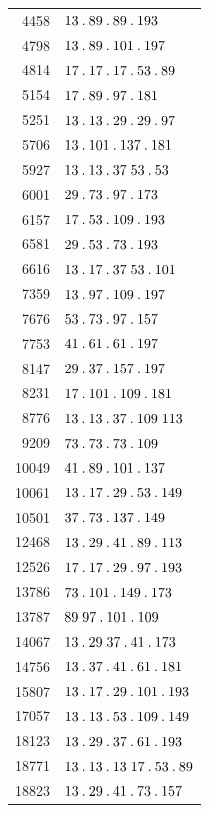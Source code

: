 \begin{longtable}{@{}r|l@{}}
4458 & $13\mathbin{.} 89\mathbin{.} 89\mathbin{.} 193$\\
4798 & $13\mathbin{.} 89\mathbin{.} 101\mathbin{.} 197$\\
4814 & $17\mathbin{.} 17\mathbin{.} 17\mathbin{.} 53\mathbin{.} 89$\\
5154 & $17\mathbin{.} 89\mathbin{.} 97\mathbin{.} 181$\\
5251 & $13\mathbin{.} 13\mathbin{.} 29\mathbin{.} 29\mathbin{.} 97$\\
5706 & $13\mathbin{.} 101\mathbin{.} 137\mathbin{.} 181$\\
5927 & $13\mathbin{.} 13\mathbin{.} 37\;53\mathbin{.} 53$\\
6001 & $29\mathbin{.} 73\mathbin{.} 97\mathbin{.} 173$\\
6157 & $17\mathbin{.} 53\mathbin{.} 109\mathbin{.} 193$\\
6581 & $29\mathbin{.} 53\mathbin{.} 73\mathbin{.} 193$\\
6616 & $13\mathbin{.} 17\mathbin{.} 37\;53\mathbin{.} 101$\\
7359 & $13\mathbin{.} 97\mathbin{.} 109\mathbin{.} 197$\\
7676 & $53\mathbin{.} 73\mathbin{.} 97\mathbin{.} 157$\\
7753 & $41\mathbin{.} 61\mathbin{.} 61\mathbin{.} 197$\\
8147 & $29\mathbin{.} 37\mathbin{.} 157\mathbin{.} 197$\\
8231 & $17\mathbin{.} 101\mathbin{.} 109\mathbin{.} 181$\\
8776 & $13\mathbin{.} 13\mathbin{.} 37\mathbin{.} 109\;113$\\
9209 & $73\mathbin{.} 73\mathbin{.} 73\mathbin{.} 109$\\
10049 & $41\mathbin{.} 89\mathbin{.} 101\mathbin{.} 137$\\
10061 & $13\mathbin{.} 17\mathbin{.} 29\mathbin{.} 53\mathbin{.} 149$\\
10501 & $37\mathbin{.} 73\mathbin{.} 137\mathbin{.} 149$\\
12468 & $13\mathbin{.} 29\mathbin{.} 41\mathbin{.} 89\mathbin{.} 113$\\
12526 & $17\mathbin{.} 17\mathbin{.} 29\mathbin{.} 97\mathbin{.} 193$\\
13786 & $73\mathbin{.} 101\mathbin{.} 149\mathbin{.} 173$\\
13787 & $89\;97\mathbin{.} 101\mathbin{.} 109$\\
14067 & $13\mathbin{.} 29\;37\mathbin{.} 41\mathbin{.} 173$\\
14756 & $13\mathbin{.} 37\mathbin{.} 41\mathbin{.} 61\mathbin{.} 181$\\
15807 & $13\mathbin{.} 17\mathbin{.} 29\mathbin{.} 101\mathbin{.} 193$\\
17057 & $13\mathbin{.} 13\mathbin{.} 53\mathbin{.} 109\mathbin{.} 149$\\
18123 & $13\mathbin{.} 29\mathbin{.} 37\mathbin{.} 61\mathbin{.} 193$\\
18771 & $13\mathbin{.} 13\mathbin{.} 13\;17\mathbin{.} 53\mathbin{.} 89$\\
18823 & $13\mathbin{.} 29\mathbin{.} 41\mathbin{.} 73\mathbin{.} 157$\\

\end{longtable}
